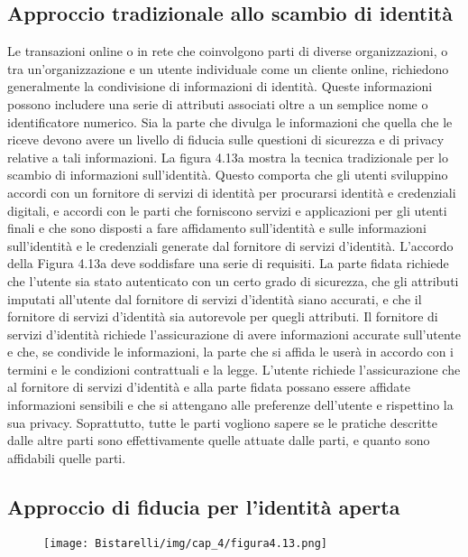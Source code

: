\subsection{Approccio tradizionale allo scambio di identità}
Le transazioni online o in rete che coinvolgono parti di diverse organizzazioni, o tra un'organizzazione e un utente individuale come un cliente online, richiedono generalmente la condivisione di informazioni di identità. Queste informazioni possono includere una serie di attributi associati oltre a un semplice nome o identificatore numerico. Sia la parte che divulga le informazioni che quella che le riceve devono avere un livello di fiducia sulle questioni di sicurezza e di privacy relative a tali informazioni. La figura 4.13a mostra la tecnica tradizionale per lo scambio di informazioni sull'identità. Questo comporta che gli utenti sviluppino accordi con un fornitore di servizi di identità per procurarsi identità e credenziali digitali, e accordi con le parti che forniscono servizi e applicazioni per gli utenti finali e che sono disposti a fare affidamento sull'identità e sulle informazioni sull'identità e le credenziali generate dal fornitore di servizi d'identità. L'accordo della Figura 4.13a deve soddisfare una serie di requisiti. La parte fidata richiede che l'utente sia stato autenticato con un certo grado di sicurezza, che gli attributi imputati all'utente dal fornitore di servizi d'identità siano accurati, e che il fornitore di servizi d'identità sia autorevole per quegli attributi. Il fornitore di servizi d'identità richiede l'assicurazione di avere informazioni accurate sull'utente e che, se condivide le informazioni, la parte che si affida le userà in accordo con i termini e le condizioni contrattuali e la legge. L'utente richiede l'assicurazione che al fornitore di servizi d'identità e alla parte fidata possano essere affidate informazioni sensibili e che si attengano alle preferenze dell'utente e rispettino la sua privacy. Soprattutto, tutte le parti vogliono sapere se le pratiche descritte dalle altre parti sono effettivamente quelle attuate dalle parti, e quanto sono affidabili quelle parti.

\subsection{Approccio di fiducia per l'identità aperta}

\begin{figure}[H]
	\centering
    \texttt{[image: Bistarelli/img/cap\_4/figura4.13.png]}
\end{figure}


